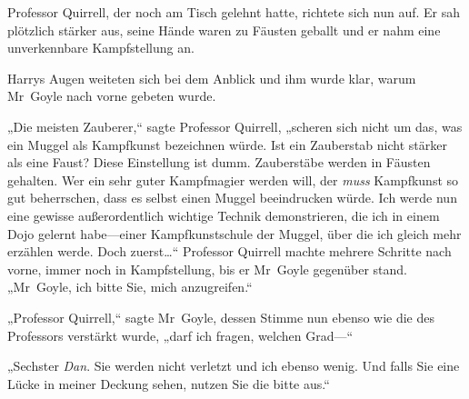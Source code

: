 Professor Quirrell, der noch am Tisch gelehnt hatte, richtete sich nun auf. Er sah plötzlich stärker aus, seine Hände waren zu Fäusten geballt und er nahm eine unverkennbare Kampfstellung an.

Harrys Augen weiteten sich bei dem Anblick und ihm wurde klar, warum Mr~Goyle nach vorne gebeten wurde.

„Die meisten Zauberer,“ sagte Professor Quirrell, „scheren sich nicht um das, was ein Muggel als Kampfkunst bezeichnen würde. Ist ein Zauberstab nicht stärker als eine Faust? Diese Einstellung ist dumm. Zauberstäbe werden in Fäusten gehalten. Wer ein sehr guter Kampfmagier werden will, der \emph{muss} Kampfkunst so gut beherrschen, dass es selbst einen Muggel beeindrucken würde. Ich werde nun eine gewisse außerordentlich wichtige Technik demonstrieren, die ich in einem Dojo gelernt habe—einer Kampfkunstschule der Muggel, über die ich gleich mehr erzählen werde. Doch zuerst…“ Professor Quirrell machte mehrere Schritte nach vorne, immer noch in Kampfstellung, bis er Mr~Goyle gegenüber stand. „Mr~Goyle, ich bitte Sie, mich anzugreifen.“

„Professor Quirrell,“ sagte Mr~Goyle, dessen Stimme nun ebenso wie die des Professors verstärkt wurde, „darf ich fragen, welchen Grad—“

„Sechster \emph{Dan}. Sie werden nicht verletzt und ich ebenso wenig. Und falls Sie eine Lücke in meiner Deckung sehen, nutzen Sie die bitte aus.“

